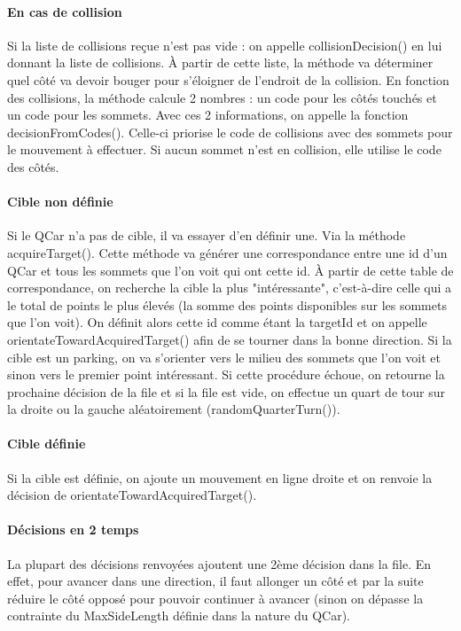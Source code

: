 \documentclass[a4paper, 12pt]{article}
\begin{document}
\paragraph{En cas de collision} Si la liste de collisions reçue n'est pas vide : on appelle collisionDecision() en lui donnant la liste de collisions. À partir de cette liste, la méthode va déterminer quel côté va devoir bouger pour s'éloigner de l'endroit de la collision. En fonction des collisions, la méthode calcule 2 nombres : un code pour les côtés touchés et un code pour les sommets. Avec ces 2 informations, on appelle la fonction decisionFromCodes(). Celle-ci priorise le code de collisions avec des sommets pour le mouvement à effectuer. Si aucun sommet n'est en collision, elle utilise le code des côtés.
\paragraph{Cible non définie} Si le QCar n'a pas de cible, il va essayer d'en définir une. Via la méthode acquireTarget(). Cette méthode va générer une correspondance entre une id d'un QCar et tous les sommets que l'on voit qui ont cette id. À partir de cette table de correspondance, on recherche la cible la plus "intéressante", c'est-à-dire celle qui a le total de points le plus élevés (la somme des points disponibles sur les sommets que l'on voit). On définit alors cette id comme étant la targetId et on appelle orientateTowardAcquiredTarget() afin de se tourner dans la bonne direction. Si la cible est un parking, on va s'orienter vers le milieu des sommets que l'on voit et sinon vers le premier point intéressant. Si cette procédure échoue, on retourne la prochaine décision de la file et si la file est vide, on effectue un quart de tour sur la droite ou la gauche aléatoirement (randomQuarterTurn()).
\paragraph{Cible définie} Si la cible est définie, on ajoute un mouvement en ligne droite et on renvoie la décision de orientateTowardAcquiredTarget().
\paragraph{Décisions en 2 temps} La plupart des décisions renvoyées ajoutent une 2ème décision dans la file. En effet, pour avancer dans une direction, il faut allonger un côté et par la suite réduire le côté opposé pour pouvoir continuer à avancer (sinon on dépasse la contrainte du MaxSideLength définie dans la nature du QCar).
\end{document}
